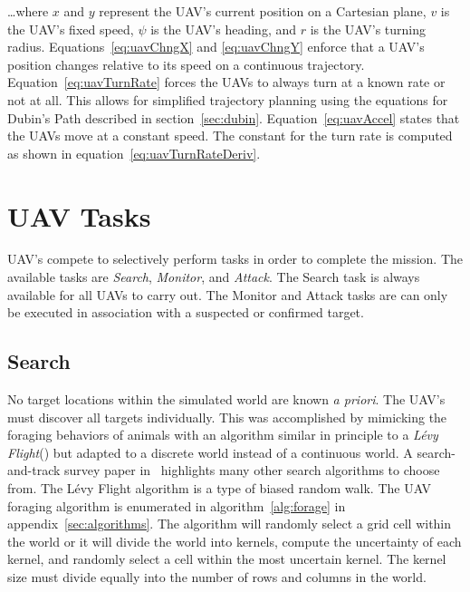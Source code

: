 \dots where $x$ and $y$ represent the UAV's current position on a Cartesian plane, $v$ is the UAV's fixed speed, $\psi$ is the UAV's heading, and $r$ is the UAV's turning radius.  Equations~\ref{eq:uavChngX} and \ref{eq:uavChngY} enforce that a UAV's position changes relative to its speed on a continuous trajectory.  Equation~\ref{eq:uavTurnRate} forces the UAVs to always turn at a known rate or not at all.  This allows for simplified trajectory planning using the equations for Dubin's Path described in section~\ref{sec:dubin}.  Equation~\ref{eq:uavAccel} states that the UAVs move at a constant speed.  The constant for the turn rate is computed as shown in equation~\ref{eq:uavTurnRateDeriv}.






\section{UAV Tasks}
UAV's compete to selectively perform tasks in order to complete the mission.  The available tasks are \textit{Search}, \textit{Monitor}, and \textit{Attack}.  The Search task is always available for all UAVs to carry out.  The Monitor and Attack tasks are can only be executed in association with a suspected or confirmed target.

\subsection{Search}
No target locations within the simulated world are known \textit{a priori}.  The UAV's must discover all targets individually.  This was accomplished by mimicking the foraging behaviors of animals with an algorithm similar in principle to a \textit{L\'evy Flight}(\cite{humphries}) but adapted to a discrete world instead of a continuous world.  A search-and-track survey paper in~\cite{senanayake} highlights many other search algorithms to choose from.  The L\'evy Flight algorithm is a type of biased random walk.  The UAV foraging algorithm is enumerated in algorithm~\ref{alg:forage} in appendix~\ref{sec:algorithms}.  The algorithm will randomly select a grid cell within the world or it will divide the world into kernels, compute the uncertainty of each kernel, and randomly select a cell within the most uncertain kernel.  The kernel size must divide equally into the number of rows and columns in the world.

